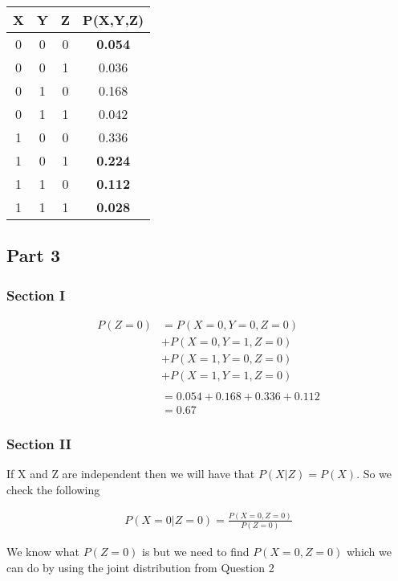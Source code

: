 \documentclass[a4paper, 12pt]{article}
\begin{document}
			\begin{center}
				\begin{tabular}{|c|c|c|c|}
					\hline
					X & Y & Z & P(X,Y,Z)\\
					\hline
					0 & 0 & 0 & \textbf{0.054}\\
					0 & 0 & 1 & 0.036\\
					0 & 1 & 0 & 0.168\\
					0 & 1 & 1 & 0.042\\
					1 & 0 & 0 & 0.336\\
					1 & 0 & 1 & \textbf{0.224}\\
					1 & 1 & 0 & \textbf{0.112}\\
					1 & 1 & 1 & \textbf{0.028}\\
					\hline
				\end{tabular}
			\end{center}				
	
		\subsection{Part 3}
			\subsubsection{Section I}
				\begin{equation}
					\begin{split}
						P(Z=0) & = P(X=0,Y=0,Z=0)
						\\
						& + P(X=0,Y=1,Z=0)
						\\
						& + P(X=1,Y=0,Z=0)
						\\
						& + P(X=1,Y=1,Z=0)	
						\\\\
						& = 0.054 + 0.168 + 0.336 + 0.112
						\\
						& = 0.67
					\end{split}
				\end{equation}								
				\subsubsection{Section II}
				If X and Z are independent then we will have that $P(X|Z) = P(X)$. So we check the following
				
				\begin{align*}
					P(X=0|Z=0) = \frac{P(X=0,Z=0)}{P(Z=0)}
				\end{align*}
				
				We know what $P(Z=0)$ is but we need to find $P(X=0,Z=0)$ which we can do by using the joint distribution from Question 2
				
\end{document}
